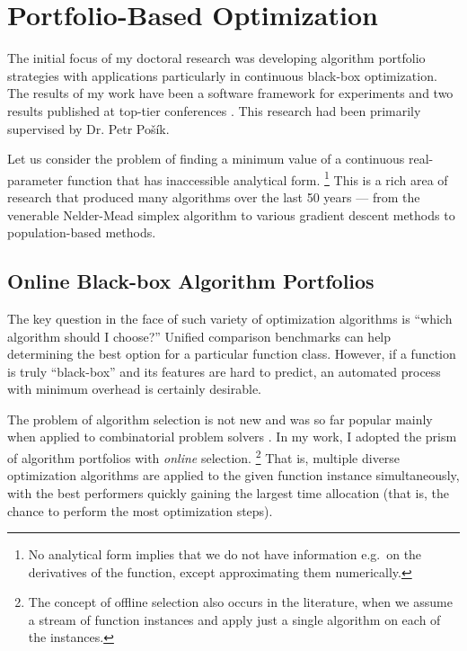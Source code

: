 \chapter{Portfolio-Based Optimization}
\label{app:opt}

The initial focus of my doctoral research
was developing algorithm portfolio strategies
with applications particularly in continuous black-box optimization.
The results of my work have been a software framework for experiments
\citep{cocopf}
and two results published at top-tier conferences \citep{Baudis2014PPSNOnlinePortfolios,Baudis2015GECCO}.
This research had been primarily supervised by Dr. Petr Pošík.

Let us consider the problem of finding a minimum value of a continuous
real-parameter function that has inaccessible analytical form.%
\footnote{No analytical form implies that we do not have information
e.g.\ on the derivatives of the function, except approximating
them numerically.}
This is a rich area of research that produced many algorithms over
the last 50 years --- from the venerable Nelder-Mead simplex
algorithm \citep{NM1} to various gradient descent methods to
population-based methods.

\section{Online Black-box Algorithm Portfolios}

The key question in the face of such variety of optimization
algorithms is ``which algorithm should I choose?''
Unified comparison benchmarks \citep{COCO1}
can help determining the best option for a particular function class.
However, if a function is truly ``black-box'' and its features
are hard to predict, an automated process with minimum overhead
is certainly desirable.

The problem of algorithm selection is not new \citep{Rice}
and was so far popular mainly when applied to
combinatorial problem solvers \citep{combpfsurvey}.
In my work, I adopted the prism of algorithm portfolios \citep{algportfolios}
with \textit{online} selection.%
\footnote{The concept of offline selection also occurs in the literature,
	when we assume a stream of function instances and apply just a single
	algorithm on each of the instances.}
That is, multiple diverse optimization algorithms are applied
to the given function instance simultaneously, with the best
performers quickly gaining the largest time allocation (that is,
the chance to perform the most optimization steps).


